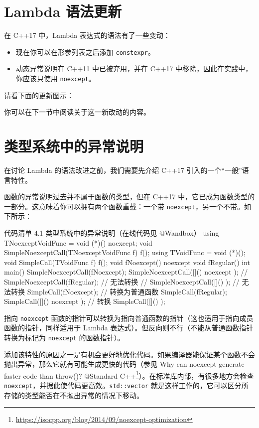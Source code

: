 \section{Lambda 语法更新}

在 C++17 中，Lambda 表达式的语法有了一些变动：

\begin{itemize}
\item 现在你可以在形参列表之后添加 \texttt{constexpr}。
\item 动态异常说明在 C++11 中已被弃用，并在 C++17 中移除，因此在实践中，你应该只使用 \texttt{noexcept}。
\end{itemize}

请看下面的更新图示：


你可以在下一节中阅读关于这一新改动的内容。

\section{类型系统中的异常说明}

在讨论 Lambda 的语法改进之前，我们需要先介绍 C++17 引入的一个“一般”语言特性。

函数的异常说明过去并不属于函数的类型，但在 C++17 中，它已成为函数类型的一部分。这意味着你可以拥有两个函数重载：一个带 \texttt{noexcept}，另一个不带。如下所示：

\begin{codeboxt}{代码清单 4.1 类型系统中的异常说明（在线代码见 @Wandbox）}
using TNoexceptVoidFunc = void (*)() noexcept;
void SimpleNoexceptCall(TNoexceptVoidFunc f) { f(); }
using TVoidFunc = void (*)();
void SimpleCall(TVoidFunc f) { f(); }
void fNoexcept() noexcept { }
void fRegular() { }
int main() {
SimpleNoexceptCall(fNoexcept);
SimpleNoexceptCall([]() noexcept { });
// SimpleNoexceptCall(fRegular);
// 无法转换
// SimpleNoexceptCall([]() { });
// 无法转换
SimpleCall(fNoexcept); // 转换为普通函数
SimpleCall(fRegular);
SimpleCall([]() noexcept { });
// 转换
SimpleCall([]() { });
}
\end{codeboxt}

指向 \texttt{noexcept} 函数的指针可以转换为指向普通函数的指针（这也适用于指向成员函数的指针，同样适用于 Lambda 表达式）。但反向则不行（不能从普通函数指针转换为标记为 \texttt{noexcept} 的函数指针）。

添加该特性的原因之一是有机会更好地优化代码。如果编译器能保证某个函数不会抛出异常，那么它就有可能生成更快的代码（参见 Why can noexcept generate faster code than throw()? @Standard C++\footnote{\url{https://isocpp.org/blog/2014/09/noexcept-optimization}}）。在标准库内部，有很多地方会检查 \texttt{noexcept}，并据此使代码更高效。\texttt{std::vector} 就是这样工作的，它可以区分所存储的类型能否在不抛出异常的情况下移动。

